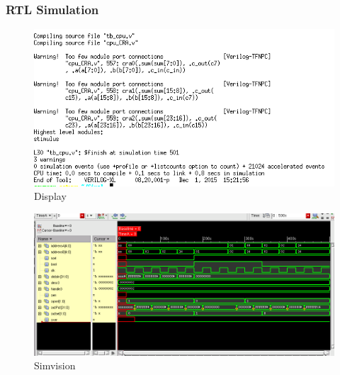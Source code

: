 \documentclass[12pt]{article}
\begin{document}
\subsubsection{RTL Simulation}
\begin{figure}[H]
\centering
\includegraphics[width=\linewidth]{../CRA/CRA-text}
\caption{Display}
\label{fig:CRA-text}
\end{figure}
\begin{figure}[H]
\centering
\includegraphics[width=\linewidth]{../CRA/CRA-test}
\caption{Simvision}
\label{fig:CRA-test}
\end{figure}
\end{document}
